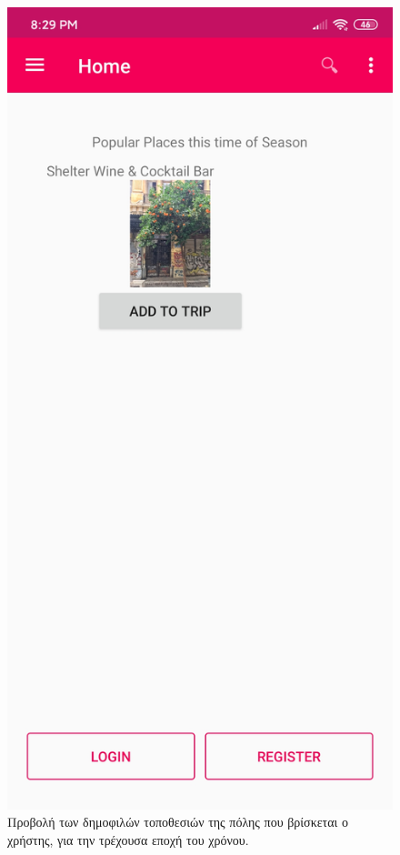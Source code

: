 \documentclass[oneside, 12pt]{book}
\begin{document}
\begin{figure}[h]
  \centering
  \includegraphics[scale=0.15]{images/popular_season_places.jpg}
  \caption{\label{fig:popular_season_places}Προβολή των δημοφιλών τοποθεσιών της πόλης που βρίσκεται ο χρήστης, για την τρέχουσα εποχή του χρόνου.}
\end{figure}
\end{document}
